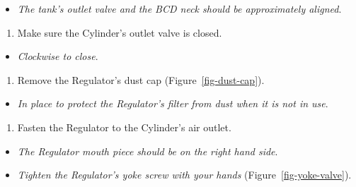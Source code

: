 \documentclass[
  letterpaper,
  DIV=11,
  numbers=noendperiod]{scrreprt}
\providecommand{\tightlist}{%
  \setlength{\itemsep}{0pt}\setlength{\parskip}{0pt}}\usepackage{longtable,booktabs,array}
\begin{document}
\begin{itemize}
\tightlist
\item
  \emph{The tank's outlet valve and the BCD neck should be approximately
  aligned}.
\end{itemize}

\begin{enumerate}
\def\labelenumi{\arabic{enumi}.}
\setcounter{enumi}{3}
\tightlist
\item
  Make sure the Cylinder's outlet valve is closed.
\end{enumerate}

\begin{itemize}
\tightlist
\item
  \emph{Clockwise to close}.
\end{itemize}

\begin{enumerate}
\def\labelenumi{\arabic{enumi}.}
\setcounter{enumi}{4}
\tightlist
\item
  Remove the Regulator's dust cap (Figure~\ref{fig-dust-cap}).
\end{enumerate}

\begin{itemize}
\tightlist
\item
  \emph{In place to protect the Regulator's filter from dust when it is
  not in use}.
\end{itemize}

\begin{enumerate}
\def\labelenumi{\arabic{enumi}.}
\setcounter{enumi}{5}
\tightlist
\item
  Fasten the Regulator to the Cylinder's air outlet.
\end{enumerate}

\begin{itemize}
\tightlist
\item
  \emph{The Regulator mouth piece should be on the right hand side}.
\item
  \emph{Tighten the Regulator's yoke screw with your hands}
  (Figure~\ref{fig-yoke-valve}).
\end{itemize}
\end{document}

